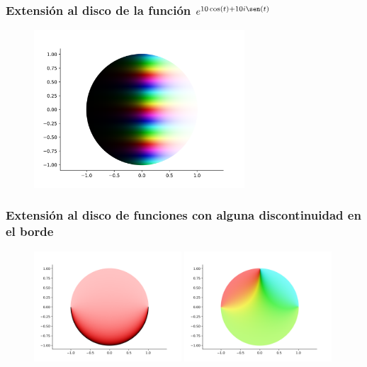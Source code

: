 \documentclass[spanish, a4paper, 12pt, final, slideColor, nototal, colorBG, pdf, noaccumulate, darkblue]{beamer}
\begin{document}
\begin{frame}
    \frametitle{Extensión al disco de la función $e^{10 \cos(t)+10i \sen(t)}$}
    \begin{figure}[!htbp]
        \centering
        \includegraphics[width=0.7\textwidth]{../Aplicacion/e^(10cos(t)+10isen(t)).png}
        \label{fig:comp_e^z}
    \end{figure}
\end{frame}

\begin{frame}
    \frametitle{Extensión al disco de funciones con alguna discontinuidad en el borde}
    \begin{figure}[!htbp]
        \centering
        \includegraphics[width=0.49\textwidth]{../Aplicacion/atrozos.png}
        \hfil
        \includegraphics[width=0.49\textwidth]{../Aplicacion/atrozos(2).png}
        \label{fig:atrozos}
    \end{figure}
\end{frame}
\end{document}
